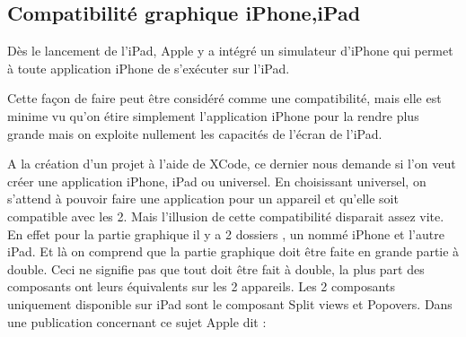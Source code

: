 	\subsection{Compatibilité graphique iPhone,iPad}
	Dès le lancement de l'iPad, Apple y a intégré un simulateur d'iPhone qui permet à toute application iPhone de s'exécuter sur l'iPad. 
			\begin{figure} [H]
				\centering 
			\end{figure}
	Cette façon de faire peut être considéré comme une compatibilité, mais elle est minime vu qu'on étire simplement l'application iPhone pour la rendre plus grande mais on exploite nullement les capacités de l'écran de l'iPad.
	
	A la création d'un projet à l'aide de XCode, ce dernier nous demande si l'on veut créer une application iPhone, iPad ou universel. En choisissant universel, on s'attend à pouvoir faire une application pour un appareil et qu'elle soit compatible avec les 2. Mais l'illusion de cette compatibilité disparait assez vite. En effet pour la partie graphique il y a 2 dossiers , un nommé iPhone et l'autre iPad. Et là on comprend que la partie graphique doit être faite en grande partie à double. Ceci ne signifie pas que tout doit être fait à double, la plus part des composants ont leurs équivalents sur les 2 appareils. Les 2 composants uniquement disponible sur iPad sont le composant Split views et Popovers. 
	Dans une publication concernant\cite{appleComp} ce sujet  Apple  dit :\\
	
